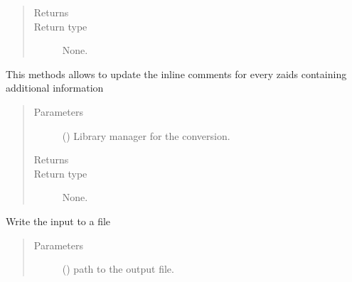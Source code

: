 \documentclass[letterpaper,10pt,english]{sphinxmanual}
\begin{document}
\begin{fulllineitems}
\begin{fulllineitems}
\begin{quote}
\begin{description}
\begin{itemize}
\end{itemize}

\item[{Returns}] \leavevmode
\sphinxAtStartPar


\item[{Return type}] \leavevmode
\sphinxAtStartPar
None.

\end{description}\end{quote}

\end{fulllineitems}


\begin{fulllineitems}
\label{\detokenize{api/inputgeneration:inputfile.InputFile.update_zaidinfo}}
\sphinxAtStartPar
This methods allows to update the in\sphinxhyphen{}line comments for every zaids
containing additional information
\begin{quote}\begin{description}
\item[{Parameters}] \leavevmode
\sphinxAtStartPar
{} ({\hyperref[\detokenize{api/initobjects:libmanager.LibManager}]{}}) \textendash{} Library manager for the conversion.

\item[{Returns}] \leavevmode
\sphinxAtStartPar


\item[{Return type}] \leavevmode
\sphinxAtStartPar
None.

\end{description}\end{quote}

\end{fulllineitems}


\begin{fulllineitems}
\label{\detokenize{api/inputgeneration:inputfile.InputFile.write}}
\sphinxAtStartPar
Write the input to a file
\begin{quote}\begin{description}
\item[{Parameters}] \leavevmode
\sphinxAtStartPar
{} () \textendash{} path to the output file.


\end{description}
\end{quote}
\end{fulllineitems}
\end{fulllineitems}
\end{document}
